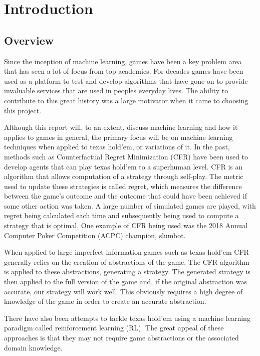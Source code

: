\chapter{Introduction}
\label{ch:intro}

\section{Overview}\label{sec:overview}
Since the inception of machine learning, games have been a key problem area that has seen a lot of focus from
top academics.
For decades games have been used as a platform to test and develop algorithms that have gone on to provide invaluable
services that are used in peoples everyday lives.
The ability to contribute to this great history was a large motivator when it came to choosing this project.

Although this report will, to an extent, discuss machine learning and how it applies to games in general, the
primary focus will be on machine learning techniques when applied to texas hold'em, or variations of it.
In the past, methods such as Counterfactual Regret Minimization (CFR) have been used to develop agents that can
play texas hold'em to a superhuman level.
CFR is an algorithm that allows computation of a strategy through self-play.
The metric used to update these strategies is called regret, which measures the difference between the
game's outcome and the outcome that could have been achieved if some other action was taken.
A large number of simulated games are played, with regret being calculated each time and subsequently being used
to compute a strategy that is optimal.
One example of CFR being used was the 2018 Annual Computer Poker Competition (ACPC) champion, slumbot\citep{jackson2013slumbot}.

When applied to large imperfect information games such as texas hold'em CFR generally relies on the
creation of abstractions of the game.
The CFR algorithm is applied to these abstractions, generating a strategy.
The generated strategy is then applied to the full version of the game and, if the
original abstraction was accurate, our strategy will work well.
This obviously requires a high degree of knowledge of the game in order to create an accurate abstraction.

There have also been attempts to tackle texas hold'em using a machine learning paradigm called reinforcement
learning (RL).
The great appeal of these approaches is that they may not require game abstractions or the associated
domain knowledge.

